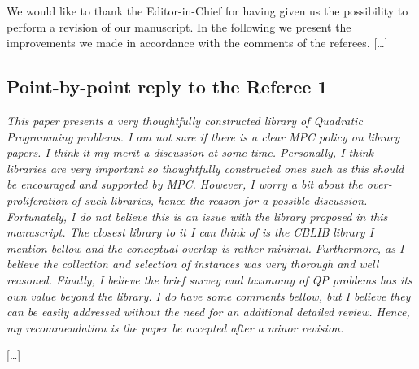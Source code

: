 \documentclass[11pt]{article}
\newcommand{\rep}[1]{{\textcolor{acblue}{#1}}}
\begin{document}
\rep{We would like to thank the Editor-in-Chief for having given us the possibility to perform a revision of our manuscript. In the following we present the improvements we made in accordance with the comments of the referees. [\dots] }




\subsection*{Point-by-point reply to the Referee 1}

{\it
This paper presents a very thoughtfully constructed library of Quadratic Programming problems. I am not sure if there is a clear MPC policy on library
papers. I think it my merit a discussion at some time. Personally, I think libraries are very important so thoughtfully constructed ones such as this should
be encouraged and supported by MPC. However, I worry a bit about the over-
proliferation of such libraries, hence the reason for a possible discussion. Fortunately, I do not believe this is an issue with the library proposed in this
manuscript. The closest library to it I can think of is the CBLIB library I
mention bellow and the conceptual overlap is rather minimal. Furthermore, as
I believe the collection and selection of instances was very thorough and well
reasoned. Finally, I believe the brief survey and taxonomy of QP problems has
its own value beyond the library. I do have some comments bellow, but I believe
they can be easily addressed without the need for an additional detailed review.
Hence, my recommendation is the paper be accepted after a minor revision.
}

\rep{[\dots] }
\end{document}
